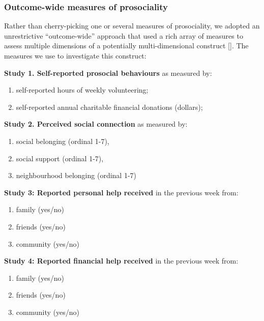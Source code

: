 \documentclass[
  singlecolumn]{article}
\providecommand{\tightlist}{%
  \setlength{\itemsep}{0pt}\setlength{\parskip}{0pt}}\usepackage{longtable,booktabs,array}
\begin{document}
\subsubsection{Outcome-wide measures of
prosociality}\label{outcome-wide-measures-of-prosociality}

Rather than cherry-picking one or several measures of prosociality, we
adopted an unrestrictive ``outcome-wide'' approach that used a rich
array of measures to assess multiple dimensions of a potentially
multi-dimensional construct {[}{]}. The measures we use to investigate
this construct:

\textbf{Study 1. Self-reported prosocial behaviours} as measured by:

\begin{enumerate}
\def\labelenumi{(\alph{enumi})}
\tightlist
\item
  self-reported hours of weekly volunteering;
\item
  self-reported annual charitable financial donations (dollars);
\end{enumerate}

\textbf{Study 2. Perceived social connection} as measured by:

\begin{enumerate}
\def\labelenumi{(\alph{enumi})}
\tightlist
\item
  social belonging (ordinal 1-7),
\item
  social support (ordinal 1-7),
\item
  neighbourhood belonging (ordinal 1-7)
\end{enumerate}

\textbf{Study 3: Reported personal help received} in the previous week
from:

\begin{enumerate}
\def\labelenumi{(\alph{enumi})}
\tightlist
\item
  family (yes/no)
\item
  friends (yes/no)
\item
  community (yes/no)
\end{enumerate}

\textbf{Study 4: Reported financial help received} in the previous week
from:

\begin{enumerate}
\def\labelenumi{(\alph{enumi})}
\tightlist
\item
  family (yes/no)
\item
  friends (yes/no)
\item
  community (yes/no)
\end{enumerate}
\end{document}
